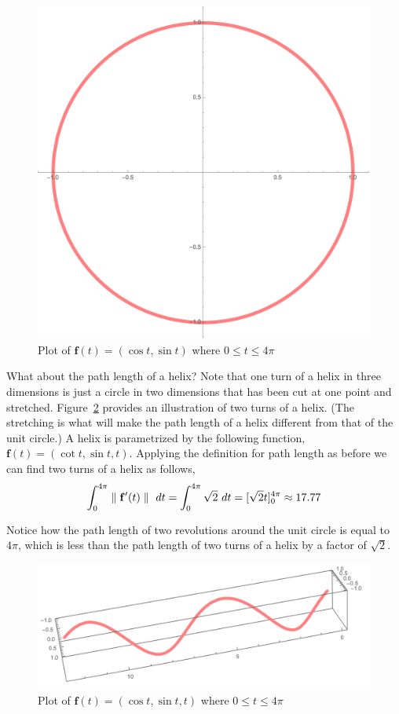 \documentclass[12pt]{article}
\begin{document}
\begin{figure}[h]
\centering
\caption{Plot of $\mathbf{f}(t) = (\cos{t}, \sin{t})$ where $0\leq t\leq 4\pi$}
\label{fig:arclengthcircle}
\indent\includegraphics[scale=0.3]{arclength_circle.png}
\end{figure}

What about the path length of a helix? Note that one turn of a helix in three dimensions is just a circle in two dimensions that has been cut at one point and stretched.  Figure~\ref{fig:arclengthhelix} provides an illustration of two turns of a helix. (The stretching is what will make the path length of a helix different from that of the unit circle.) A helix is parametrized by the following function, $\mathbf{f}(t) = (\cot{t}, \sin{t}, t)$. Applying the definition for path length as before we can find two turns of a helix as follows,
\[
\int_{0}^{4\pi} \parallel\mathbf{f}'(t)\parallel \ dt = \int_{0}^{4\pi} \sqrt{2} \ dt =  [\sqrt{2}t]_{0}^{4\pi} \approx 17.77
\]

Notice how the path length of two revolutions around the unit circle is equal to $4\pi$, which is less than the path length of two turns of a helix by a factor of $\sqrt{2}$. \\

\begin{figure}[h]
\centering
\caption{Plot of $\mathbf{f}(t) = (\cos{t}, \sin{t}, t)$ where $0\leq t\leq 4\pi$}
\label{fig:arclengthhelix}
\indent\includegraphics[scale=0.7]{arclength_helix.png}
\end{figure}
\end{document}
